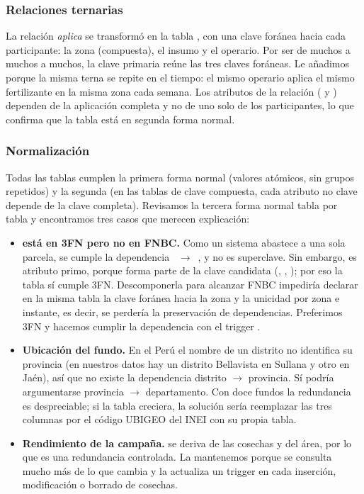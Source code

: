 \subsubsection{Relaciones ternarias}

La relación \emph{aplica} se transformó en la tabla , con una clave foránea hacia cada participante: la zona (compuesta), el insumo y el operario. Por ser de muchos a muchos a muchos, la clave primaria reúne las tres claves foráneas. Le añadimos  porque la misma terna se repite en el tiempo: el mismo operario aplica el mismo fertilizante en la misma zona cada semana. Los atributos de la relación ( y ) dependen de la aplicación completa y no de uno solo de los participantes, lo que confirma que la tabla está en segunda forma normal.

\subsubsection{Normalización}

Todas las tablas cumplen la primera forma normal (valores atómicos, sin grupos repetidos) y la segunda (en las tablas de clave compuesta, cada atributo no clave depende de la clave completa). Revisamos la tercera forma normal tabla por tabla y encontramos tres casos que merecen explicación:

\begin{itemize}[leftmargin=1.4em,itemsep=0.2em]
\item \textbf{ está en 3FN pero no en FNBC.} Como un sistema abastece a una sola parcela, se cumple la dependencia ~$\to$~, y  no es superclave. Sin embargo,  es atributo primo, porque forma parte de la clave candidata (, , ); por eso la tabla sí cumple 3FN. Descomponerla para alcanzar FNBC impediría declarar en la misma tabla la clave foránea hacia la zona y la unicidad por zona e instante, es decir, se perdería la preservación de dependencias. Preferimos 3FN y hacemos cumplir la dependencia con el trigger .
\item \textbf{Ubicación del fundo.} En el Perú el nombre de un distrito no identifica su provincia (en nuestros datos hay un distrito Bellavista en Sullana y otro en Jaén), así que no existe la dependencia distrito $\to$ provincia. Sí podría argumentarse provincia $\to$ departamento. Con doce fundos la redundancia es despreciable; si la tabla creciera, la solución sería reemplazar las tres columnas por el código UBIGEO del INEI con su propia tabla.
\item \textbf{Rendimiento de la campaña.}  se deriva de las cosechas y del área, por lo que es una redundancia controlada. La mantenemos porque se consulta mucho más de lo que cambia y la actualiza un trigger en cada inserción, modificación o borrado de cosechas.
\end{itemize}

